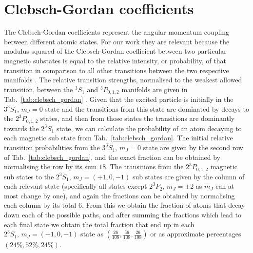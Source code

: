 \documentclass[%
 amsmath,amssymb,
aps,
]{revtex4-2}
\newcommand{\UpperState}{3^{3\!}S_1}%
\newcommand{\MetastableState}{2^{3\!}S_1}%
\newcommand{\MidState}{2^{3\!}P_{0,1,2}}%
\begin{document}
\section{Clebsch-Gordan coefficients}
The Clebsch-Gordan coefficients represent the angular momentum coupling between different atomic states. For our work they are relevant because the modulus squared of the  Clebsch-Gordan coefficient between two particular magnetic substates is equal to the relative intensity, or probability, of that transition in comparison to all other transitions between the two respective manifolds \cite{Krainov2019}. The relative transition strengths, normalised to the weakest allowed transition, between the \(^{3\!}S_1\) and \(^{3\!}P_{0,1,2}\) manifolds are given in Tab.~\ref{tab:clebsch_gordan} \cite{metcalf1999laser}. Given that the excited particle is initially in the \(\UpperState, \, m_J=0\) state and the transitions from this state are dominated by decays to the \(\MidState\) states, and then from those states the transitions are dominantly towards the \(\MetastableState\) state, we can calculate the probability of an atom decaying to each magnetic sub state from Tab.~\ref{tab:clebsch_gordan}. The initial relative transition probabilities from the \(\UpperState, \, m_J=0\) state are given by the second row of Tab.~\ref{tab:clebsch_gordan}, and the exact fraction can be obtained by normalising the row by its sum \(18\). The transitions from the \(\MidState\) magnetic sub states to the \(\MetastableState, \, m_J=(+1,0,-1)\) sub states are given by the column of each relevant state (specifically all states except \(2^{3\!}P_{2}, \, m_J=\pm2\) as \(m_J\) can at most change by one), and again the fractions can be obtained by normalising each column by its total \(6\). From this we obtain the fraction of atoms that decay down each of the possible paths, and after summing the fractions which lead to each final state we obtain the total fraction that end up in each \(\MetastableState, \, m_J=(+1,0,-1)\) state as \(\left(\frac{26}{108},\frac{56}{108},\frac{26}{108}\right)\) or as approximate percentages \(\left(24\%,52\%,24\%\right)\).
\end{document}
